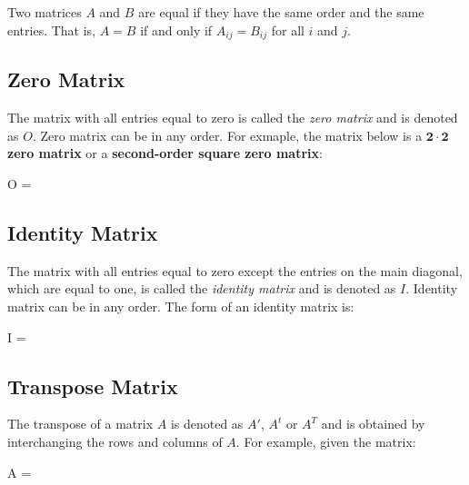 \documentclass{report}
\begin{document}
\begin{multicols}{2}
  \doublespacing{}

  Two matrices $A$ and $B$ are equal if they have the same order and the same
  entries. That is, $A = B$ if and only if $A_{ij} = B_{ij}$ for all $i$ and $j$.

  \singlespacing{}

  \subsection*{Zero Matrix}

  \doublespacing{}

  The matrix with all entries equal to zero is called the \emph{zero matrix} and
  is denoted as $O$. Zero matrix can be in any order. For exmaple, the matrix
  below is a \textbf{$\mathbf{2 \cdot 2}$ zero matrix} or a \textbf{second-order
    square zero matrix}:
  \begin{cequation}
    O = 
  \end{cequation}

  \singlespacing{}

  \subsection*{Identity Matrix}

  \doublespacing{}

  The matrix with all entries equal to zero except the entries on the main
  diagonal, which are equal to one, is called the \emph{identity matrix} and is
  denoted as $I$. Identity matrix can be in any order. The form of an identity
  matrix is:
  \begin{cequation}
    I = 
  \end{cequation}

  \singlespacing{}

  \subsection*{Transpose Matrix}

  \doublespacing{}

  The transpose of a matrix $A$ is denoted as $A'$, $A^t$ or $A^T$ and is
  obtained by interchanging the rows and columns of $A$. For example, given the
  matrix:
  \begin{cequation}
    A = 
  \end{cequation}


\end{multicols}
\end{document}
